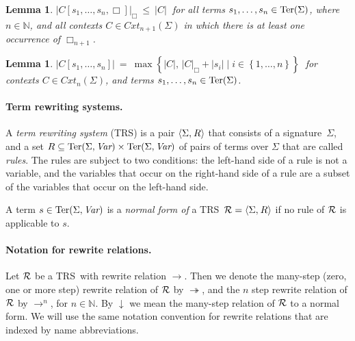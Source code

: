 \documentclass[
submission
]{dmtcs-episciences-tampered}
\newcommand{\fap}[2]{#1({#2})}
\newcommand{\iap}[2]{#1 _{#2}}
\newcommand{\indap}[2]{#1 _{#2}}
\newcommand{\subap}[2]{#1 _{#2}}
\newcommand{\supap}[2]{#1 ^{#2}}
\newcommand{\bap}{\subap}
\newcommand{\nf}{\normalfont}
\newcommand{\tuple}[1]{\langle #1 \rangle}
\newcommand{\tuplespace}{\hspace*{0.5pt}}
\newcommand{\pair}[2]{\tuple{#1, \tuplespace #2}}
\newcommand{\descsetexpmid}{\mathrel{\vert}}
\newcommand{\descsetexp}[2]{\left\{{#1}\descsetexpmid{#2}\right\}}
\newcommand{\setexp}[1]{\left\{{#1}\right\}}
\newcommand{\nat}{\mathbb{N}}
\newcommand{\ater}{s}
\newcommand{\ateri}{\indap{\ater}}
\newcommand{\asig}{\Sigma}
\newcommand{\arules}{R}
\newcommand{\aTRS}{{\cal R}}
\newcommand{\TRS}{TRS}
\newcommand{\stermsover}{\text{\nf Ter}}
\newcommand{\termsover}{\fap{\stermsover}}
\newcommand{\scontextsover}{\textit{Cxt}}
\newcommand{\scontextsnover}{\bap{\scontextsover}}
\newcommand{\contextsnover}[1]{\fap{\scontextsnover{#1}}}
\newcommand{\vars}{\textit{Var}}
\newcommand{\cxtap}[2]{{#1}[#2]}
\newcommand{\acxt}{C}
\newcommand{\acxtap}{\cxtap{\acxt}}
\newcommand{\hole}{\Box}
\newcommand{\holei}{\iap{\hole}}
\newcommand{\sdepth}{\text{\nf d}}
\newcommand{\depth}[1]{\lvert{#1}\rvert} \newcommand{\depthbig}[1]{\big\lvert{#1}\big\rvert} \newcommand{\sudepth}{\indap{\sdepth}{\text{\nf u}}}
\newcommand{\holedepth}[1]{\lvert{#1}\rvert_{\hole}}
\newcommand{\sred}{\to}
\newcommand{\smred}{\twoheadrightarrow}
\newcommand{\sredn}{\supap{\sred}}
\newcommand{\snfred}{{\downarrow}}
\theoremstyle{plain}
\newtheorem{lemma}[theorem]{Lemma}
\theoremstyle{definition}
\begin{document}
  \begin{lemma}\label{lem:holedepth:vs:depth}
    $\holedepth{ \acxtap{\ateri{1},\ldots,\ateri{n},\Box} } \:\le\: \depth{\acxt}\:$
    for all terms $\ateri{1},\ldots,\ateri{n}\in\termsover{\asig}$, where $n\in\nat$,
    and all contexts $\acxt\in\contextsnover{n+1}{\asig}$ in which there is at least one occurrence of $\holei{n+1}$. 
  \end{lemma}
  
  
  \begin{lemma}\label{lem:depth:cxtap:vs:depth:holedepth}
      $\depth{ \acxtap{\ateri{1},\ldots,\ateri{n}} }  
         \: = \: 
       \max \descsetexp{ \depth{\acxt},\, \holedepth{\acxt} + \depth{\ateri{i}} }
                       { i\in\setexp{1,\ldots,n} }\:$
    for contexts $\acxt\in\contextsnover{n}{\asig}$, and terms $\ateri{1},\ldots,\ateri{n}\in\termsover{\asig}$.
  \end{lemma}  


\paragraph{Term rewriting systems.}
  A \emph{term rewriting system} (\TRS) is a pair $\pair{\asig}{\arules}$ that consists of a signature~$\asig$,
  and a set $\arules \subseteq \termsover{\asig,\vars}\times\termsover{\asig,\vars}$ of pairs of terms over $\asig$ that are called \emph{rules}.
  The rules are subject to two conditions: the left-hand side of a rule is not a variable,
  and the variables that occur on the right-hand side of a rule are a subset of the variables that occur on the left-hand side.
  
  A term $\ater\in\termsover{\asig,\vars}$ is a \emph{normal form of} a TRS~$\aTRS = \pair{\asig}{\arules}$ if no rule of $\aTRS$ is applicable to $\ater$.
    
    
  
    
    
    

\paragraph{Notation for rewrite relations.}
  Let $\aTRS$ be a \TRS\ with rewrite relation $\sred$. 
  Then we denote the many-step (zero, one or more step) rewrite relation of $\aTRS$ by $\smred$,
  and the $n$ step rewrite relation of $\aTRS$ by $\sredn{n}$, for $n\in\nat$. 
  By $\snfred$ we mean the many-step relation of $\aTRS$ to a normal form. 
  We will use the same notation convention for rewrite relations that are indexed by name abbreviations.
  
\end{document}

